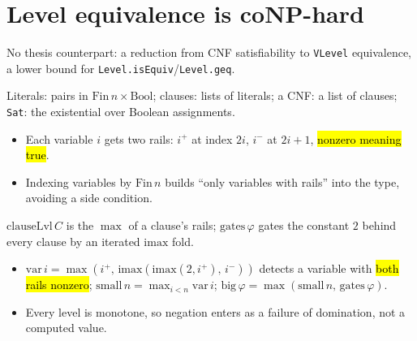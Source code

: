 \section{Level equivalence is coNP-hard}

No thesis counterpart: a reduction from CNF satisfiability to \texttt{VLevel}
equivalence, a lower bound for \texttt{Level.isEquiv}/\texttt{Level.geq}.

\begin{definition}
\label{def:levelsat-cnf}
\leanok
{}

 Literals: pairs in $\mathrm{Fin}\,n \times \mathrm{Bool}$; clauses:
lists of literals; a CNF: a list of clauses; \texttt{Sat}: the existential over Boolean
assignments.
\begin{itemize}
\item Each variable $i$ gets two rails: $i^{+}$ at index $2i$, $i^{-}$ at $2i+1$, \hl{nonzero
meaning true}.
\item Indexing variables by $\mathrm{Fin}\,n$ builds ``only variables with rails'' into
the type, avoiding a side condition.
\end{itemize}
\end{definition}

\begin{definition}
\label{def:levelsat-levels}
\leanok
{}

 $\mathrm{clauseLvl}\,C$ is the $\max$ of a clause's rails;
$\mathrm{gates}\,\varphi$ gates the constant $2$ behind every clause by an iterated
$\mathrm{imax}$ fold.
\begin{itemize}
\item $\mathrm{var}\,i = \max(i^{+},\,\mathrm{imax}(\mathrm{imax}(2,i^{+}),\,i^{-}))$
detects a variable with \hl{both rails nonzero}; $\mathrm{small}\,n = \max_{i<n}\mathrm{var}\,i$;
$\mathrm{big}\,\varphi = \max(\mathrm{small}\,n,\,\mathrm{gates}\,\varphi)$.
\item Every level is monotone, so negation enters as a failure of domination, not a
computed value.
\end{itemize}
\end{definition}

